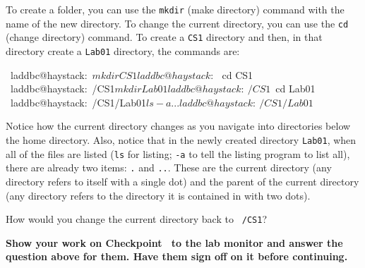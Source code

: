 \documentclass[12pt,twoside]{memoir}
\begin{document}
\begin{Exercise}[name={Checkpoint},title={Create a CS1 and a Lab01 folder.}]
To create a folder, you can use the \texttt{mkdir} (make directory)
command with the name of the new directory. To change the current
directory, you can use the \texttt{cd} (change directory) command. To
create a \texttt{CS1} directory and then, in that directory create a
\texttt{Lab01} directory, the commands are:

\begin{commandline}
 laddbc@haystack:~$ mkdir CS1
 laddbc@haystack:~$ cd CS1
 laddbc@haystack:~/CS1$ mkdir Lab01
 laddbc@haystack:~/CS1$ cd Lab01
 laddbc@haystack:~/CS1/Lab01$ ls -a
 . ..
 laddbc@haystack:~/CS1/Lab01$ 
\end{commandline}

\noindent
Notice how the current directory changes as you navigate into
directories below the home directory. Also, notice that in the newly
created directory \texttt{Lab01}, when all of the files are listed
(\texttt{ls} for listing; \texttt{-a} to tell the listing program to list
all), there are already two items: \texttt{.} and \texttt{..}. These are
the current directory (any directory refers to itself with a single
dot) and the parent of the current directory (any directory refers to
the directory it is contained in with two dots). 

How would you change the current directory back to \texttt{~/CS1}?
\end{Exercise}
\noindent
\textbf{Show your work on Checkpoint~\theExercise{} to the lab monitor
  and answer the question above for them.  Have them sign off on it
  before continuing.}
\end{document}
